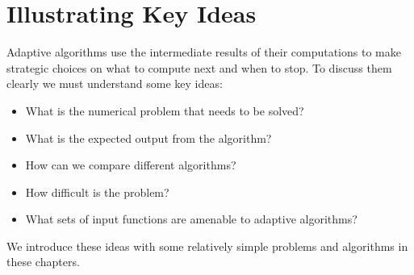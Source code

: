\part{Illustrating Key Ideas} \label{part:Key}
Adaptive algorithms use the intermediate results of their computations to make strategic choices on what to compute next and when to stop.  To discuss them clearly we must understand some key ideas: 
\begin{itemize}
    \item What is the numerical problem that needs to be solved?
    
    \item What is the expected output from the algorithm? 
    
    \item How can we compare different algorithms? 
    
    \item How difficult is the problem?
    
    \item What sets of input functions are amenable to adaptive algorithms?
\end{itemize}  
We introduce these ideas with some relatively simple problems and algorithms in these chapters.